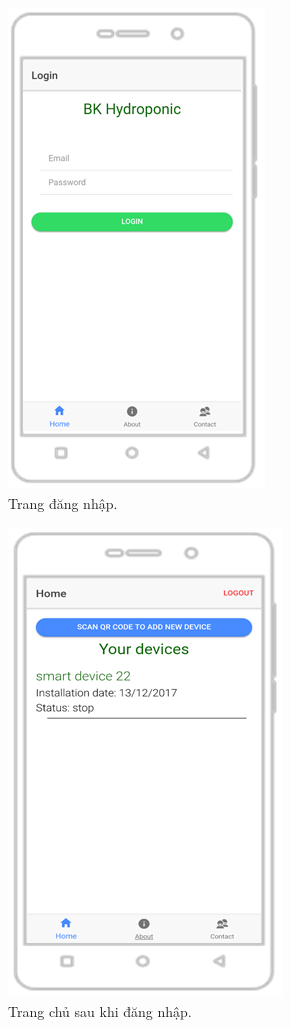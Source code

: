 \documentclass[a4paper,12pt,oneside]{article}
\begin{document}
\begin{figure}[H]
\centering
\includegraphics[scale=1]{hinh/mobile_login.png}
\caption{Trang đăng nhập.}
\end{figure}

\begin{figure}[H]
\centering
\includegraphics[scale=1]{hinh/mobile_home.png}
\caption{Trang chủ sau khi đăng nhập.}
\end{figure}
\end{document}
